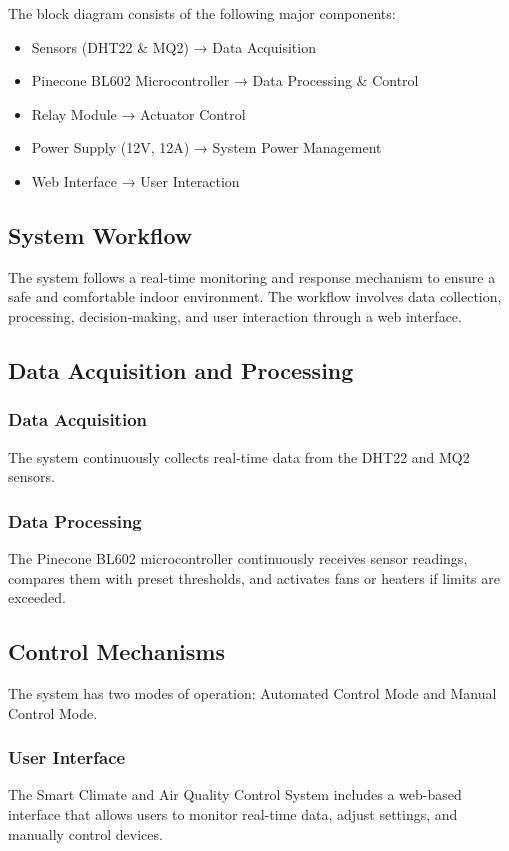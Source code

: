 \documentclass[a4paper]{scrartcl}
\begin{document}
The block diagram consists of the following major components:
\begin{itemize}
    \item Sensors (DHT22 \& MQ2) → Data Acquisition
    \item Pinecone BL602 Microcontroller → Data Processing \& Control
    \item Relay Module → Actuator Control
    \item Power Supply (12V, 12A) → System Power Management
    \item Web Interface → User Interaction
\end{itemize}

\subsection{System Workflow}
The system follows a real-time monitoring and response mechanism to ensure a safe and comfortable indoor environment. The workflow involves data collection, processing, decision-making, and user interaction through a web interface.

\subsection{Data Acquisition and Processing}
\subsubsection{Data Acquisition}
The system continuously collects real-time data from the DHT22 and MQ2 sensors.

\subsubsection{Data Processing}
The Pinecone BL602 microcontroller continuously receives sensor readings, compares them with preset thresholds, and activates fans or heaters if limits are exceeded.

\subsection{Control Mechanisms}
The system has two modes of operation: Automated Control Mode and Manual Control Mode. 

\subsubsection{User Interface}
The Smart Climate and Air Quality Control System includes a web-based interface that allows users to monitor real-time data, adjust settings, and manually control devices.
\end{document}
